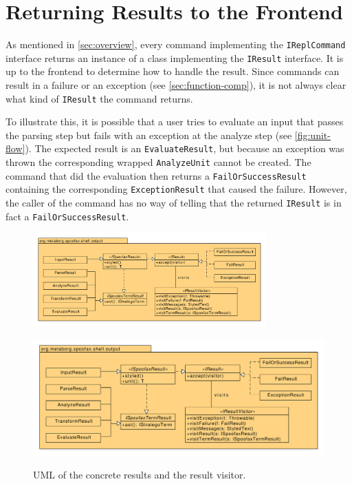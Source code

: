 \section{Returning Results to the Frontend}
\label{sec:visitor}

As mentioned in \cref{sec:overview}, every command implementing the
\texttt{IReplCommand} interface returns an instance of a class implementing
the \texttt{IResult} interface. It is up to the frontend to determine how to
handle the result. Since commands can result in a failure or an exception (see
\cref{sec:function-comp}), it is not always clear what kind of
\texttt{IResult} the command returns.

To illustrate this, it is possible that a user tries to evaluate an input that
passes the parsing step but fails with an exception at the analyze step (see
\cref{fig:unit-flow}). The expected result is an \texttt{EvaluateResult},
but because an exception was thrown the corresponding wrapped
\texttt{AnalyzeUnit} cannot be created. The command that did the evaluation
then returns a \texttt{FailOrSuccessResult} containing the corresponding
\texttt{ExceptionResult} that caused the failure. However, the caller of the
command has no way of telling that the returned \texttt{IResult} is in fact a
\texttt{FailOrSuccessResult}.

\begin{figure}[t]
  \centering
  \includegraphics[width=0.8\textwidth]{uml-visitor}
  \caption{UML of the concrete results and the result visitor.}
  \includegraphics[width=\textwidth]{uml-visitor}
  \label{fig:uml-visitor}
\end{figure}

